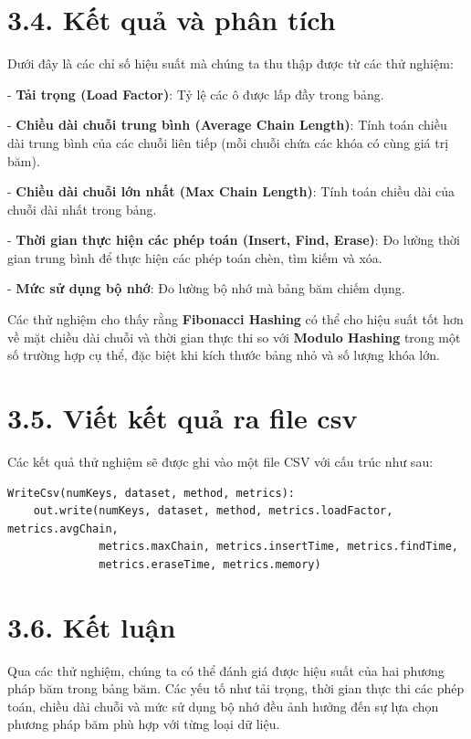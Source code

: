 \documentclass[12pt,a4paper]{report}
\begin{document}
\section*{3.4. Kết quả và phân tích}
\noindent \indent Dưới đây là các chỉ số hiệu suất mà chúng ta thu thập được từ các thử nghiệm:

    - \textbf{Tải trọng (Load Factor)}: Tỷ lệ các ô được lấp đầy trong bảng.
    
    - \textbf{Chiều dài chuỗi trung bình (Average Chain Length)}: Tính toán chiều dài trung bình của các chuỗi liên tiếp (mỗi chuỗi chứa các khóa có cùng giá trị băm).
    
    - \textbf{Chiều dài chuỗi lớn nhất (Max Chain Length)}: Tính toán chiều dài của chuỗi dài nhất trong bảng.
    
    - \textbf{Thời gian thực hiện các phép toán (Insert, Find, Erase)}: Đo lường thời gian trung bình để thực hiện các phép toán chèn, tìm kiếm và xóa.
    
    - \textbf{Mức sử dụng bộ nhớ}: Đo lường bộ nhớ mà bảng băm chiếm dụng.

Các thử nghiệm cho thấy rằng \textbf{Fibonacci Hashing} có thể cho hiệu suất tốt hơn về mặt chiều dài chuỗi và thời gian thực thi so với \textbf{Modulo Hashing} trong một số trường hợp cụ thể, đặc biệt khi kích thước bảng nhỏ và số lượng khóa lớn.

\section*{3.5. Viết kết quả ra file csv}
\noindent \indent Các kết quả thử nghiệm sẽ được ghi vào một file CSV với cấu trúc như sau:
\begin{lstlisting}[style=numbered]
WriteCsv(numKeys, dataset, method, metrics):
    out.write(numKeys, dataset, method, metrics.loadFactor, metrics.avgChain, 
              metrics.maxChain, metrics.insertTime, metrics.findTime, 
              metrics.eraseTime, metrics.memory)
\end{lstlisting}

\section*{3.6. Kết luận}
\noindent \indent Qua các thử nghiệm, chúng ta có thể đánh giá được hiệu suất của hai phương pháp băm trong bảng băm. Các yếu tố như tải trọng, thời gian thực thi các phép toán, chiều dài chuỗi và mức sử dụng bộ nhớ đều ảnh hưởng đến sự lựa chọn phương pháp băm phù hợp với từng loại dữ liệu.
\end{document}
